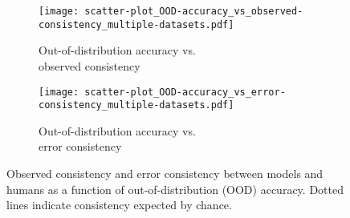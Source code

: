 \begin{figure}[h]
    \centering
    \begin{subfigure}{0.45\textwidth}
        \centering
        \texttt{[image: scatter-plot\_OOD-accuracy\_vs\_observed-consistency\_multiple-datasets.pdf]}
        \caption{Out-of-distribution accuracy vs.\\observed consistency}
        \label{subfig:error_consistency_12_datasets}
    \end{subfigure}
    \begin{subfigure}{0.45\textwidth}
        \centering
        \texttt{[image: scatter-plot\_OOD-accuracy\_vs\_error-consistency\_multiple-datasets.pdf]}
        \caption{Out-of-distribution accuracy vs.\\error consistency}
        \label{subfig:error_consistency_5_datasets}
    \end{subfigure}
    \label{fig:error_consistency_12_and_5_datasets}
    \vspace{-0.1cm}
    \caption{Observed consistency and error consistency between models and humans as a function of out-of-distribution (OOD) accuracy. Dotted lines indicate consistency expected by chance.}
\end{figure}